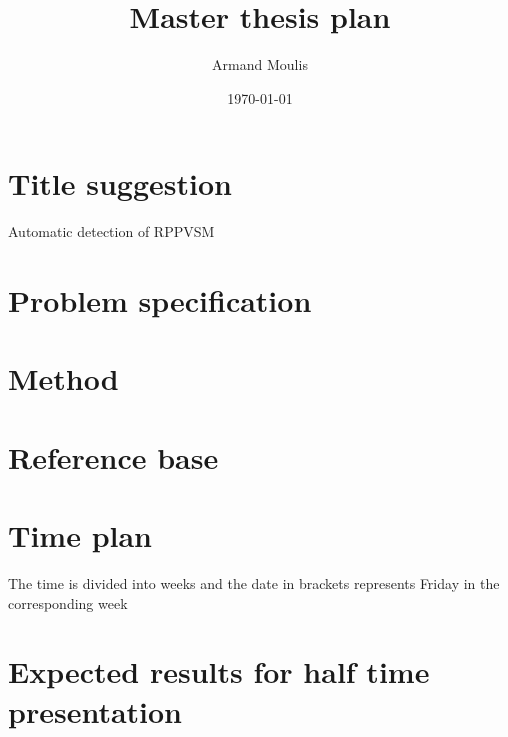 \documentclass{article}
\begin{document}
	


\title{Master thesis plan}
\author{Armand Moulis}
\date{\today}
\maketitle

\setcounter{tocdepth}{3}
\tableofcontents
\newpage
\setcounter{page}{1}



\section{Title suggestion}

Automatic detection of RPPVSM 
\section{Problem specification}

\section{Method}

\section{Reference base}

\section{Time plan}
The time is divided into weeks and the date in brackets represents Friday in the corresponding week 


\section{Expected results for half time presentation}




\end{document}
